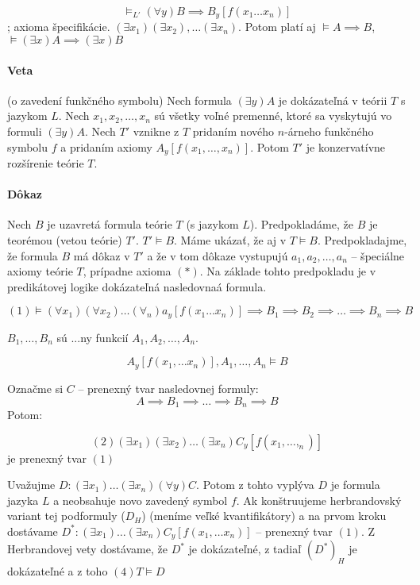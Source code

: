 $$ \models_{L'} (\forall y) B \implies B_y[f(x_1\ldots x_n)]$$; axioma
špecifikácie. $(\exists x_1)(\exists x_2), \ldots (\exists x_n)$. Potom platí aj
$\models A \implies B$, $\models (\exists x) A \implies (\exists x) B$



\paragraph{Veta} (o zavedení funkčného symbolu) Nech formula $(\exists y) A$ je
dokázateľná v teórii $T$ s jazykom $L$. Nech $x_1, x_2, \ldots, x_n$ sú všetky
voľné premenné, ktoré sa vyskytujú vo formuli $(\exists y) A$. Nech $T'$ vznikne
z $T$ pridaním nového $n$-árneho funkčného symbolu $f$ a pridaním axiomy
$A_y[f(x_1, \ldots, x_n)]$. Potom $T'$ je konzervatívne rozšírenie teórie $T$.

\paragraph{Dôkaz} Nech $B$ je uzavretá formula teórie $T$ (s jazykom $L$).
Predpokladáme, že $B$ je teorémou (vetou teórie) $T'$. $T' \models B$. Máme
ukázať, že aj v $T \models B$. Predpokladajme, že formula $B$ má dôkaz v $T'$ a
že v tom dôkaze vystupujú $a_1, a_2, \ldots, a_n$ -- špeciálne axiomy teórie
$T$, prípadne axioma $(*)$. Na základe tohto predpokladu je v predikátovej
logike dokázateľná nasledovnaá formula.

$$(1) \models (\forall x_1) (\forall x_2) \ldots (\forall _n) a_y [f(x_1 \ldots
x_n)] \implies B_1 \implies B_2 \implies \ldots \implies B_n \implies B$$

$B_1, \ldots, B_n$ sú ...ny funkcií $A_1, A_2, \ldots, A_n$. 

$$ A_y[f(x_1, \ldots x_n)], A_1, \ldots, A_n \models B$$

Označme si $C$ -- prenexný tvar nasledovnej formuly:
$$A \implies B_1 \implies \ldots \implies B_n \implies B$$
Potom:

$$ (2) (\exists x_1) (\exists x_2) \ldots (\exists x_n) C_y[f(x_1, \ldots,
_n)]$$ je prenexný tvar $(1)$

Uvažujme $D: (\exists x_1) \ldots (\exists x_n) (\forall y) C$. Potom z tohto
vyplýva $D$ je formula jazyka $L$ a neobsahuje novo zavedený symbol $f$. Ak
konštruujeme herbrandovský variant tej podformuly ($D_H$) (meníme veľké
kvantifikátory) a na prvom kroku dostávame $D^*: (\exists x_1) \ldots (\exists
x_n) C_y [f(x_1, \ldots x_n)]$ -- prenexný tvar $(1)$. Z Herbrandovej vety
dostávame, že $D^*$ je dokázateľné, z tadiaľ $(D^*)_H$ je dokázateľné a z toho 
$(4) T \models D$

